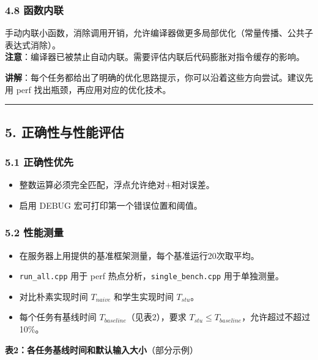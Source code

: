 \documentclass[11pt, a4paper]{article}
\begin{document}
\begin{aibox}
\subsubsection*{4.8 函数内联}
手动内联小函数，消除调用开销，允许编译器做更多局部优化（常量传播、公共子表达式消除）。\\
\textbf{注意}：编译器已被禁止自动内联。需要评估内联后代码膨胀对指令缓存的影响。

\textbf{讲解}：每个任务都给出了明确的优化思路提示，你可以沿着这些方向尝试。建议先用 perf 找出瓶颈，再应用对应的优化技术。

\begin{center}\rule{\textwidth}{0.4pt}\end{center}

\subsection*{5. 正确性与性能评估}

\subsubsection*{5.1 正确性优先}
\begin{itemize}
    \item 整数运算必须完全匹配，浮点允许绝对+相对误差。
    \item 启用 DEBUG 宏可打印第一个错误位置和阈值。
\end{itemize}

\subsubsection*{5.2 性能测量}
\begin{itemize}
    \item 在服务器上用提供的基准框架测量，每个基准运行20次取平均。
    \item \texttt{run\_all.cpp} 用于 perf 热点分析，\texttt{single\_bench.cpp} 用于单独测量。
    \item 对比朴素实现时间 $T_{naive}$ 和学生实现时间 $T_{stu}$。
    \item 每个任务有基线时间 $T_{baseline}$（见表2），要求 $T_{stu} \le T_{baseline}$，允许超过不超过10\%。
\end{itemize}

\textbf{表2：各任务基线时间和默认输入大小}（部分示例）


\end{aibox}
\end{document}
